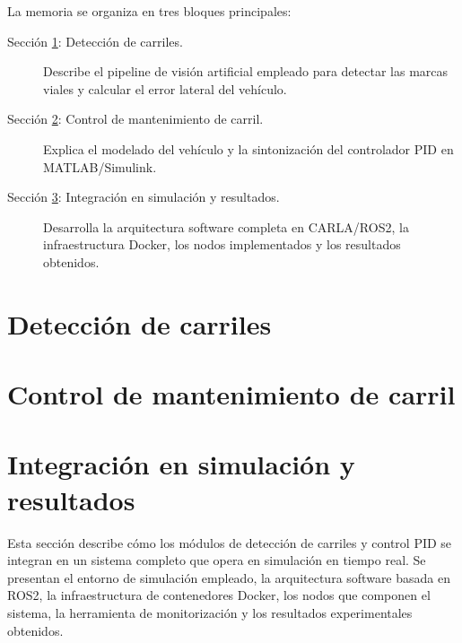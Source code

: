\documentclass[12pt, a4paper]{article}
\begin{document}
La memoria se organiza en tres bloques principales:

\begin{description}
    \item[Sección \ref{sec:carriles}: Detección de carriles.]
    Describe el pipeline de visión artificial empleado para detectar las marcas viales y calcular el error lateral del vehículo.
    \item[Sección \ref{sec:control}: Control de mantenimiento de carril.]
    Explica el modelado del vehículo y la sintonización del controlador PID en MATLAB/Simulink.
    \item[Sección \ref{sec:integracion}: Integración en simulación y resultados.]
    Desarrolla la arquitectura software completa en CARLA/ROS2, la infraestructura Docker, los nodos implementados y los resultados obtenidos.
\end{description}

\section{Detección de carriles}
\label{sec:carriles}


\section{Control de mantenimiento de carril}
\label{sec:control}


\section{Integración en simulación y resultados}
\label{sec:integracion}

Esta sección describe cómo los módulos de detección de carriles y control PID se integran en un sistema completo que opera en simulación en tiempo real. Se presentan el entorno de simulación empleado, la arquitectura software basada en ROS2, la infraestructura de contenedores Docker, los nodos que componen el sistema, la herramienta de monitorización y los resultados experimentales obtenidos.
\end{document}
